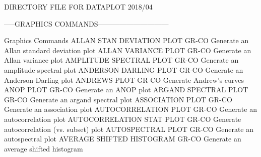                DIRECTORY FILE FOR DATAPLOT 2018/04

-----GRAPHICS COMMANDS------------------------------

Graphics Commands
ALLAN STAN DEVIATION PLOT   GR-CO Generate an Allan standard deviation plot
ALLAN VARIANCE PLOT         GR-CO Generate an Allan variance plot
AMPLITUDE SPECTRAL PLOT     GR-CO Generate an amplitude spectral plot
ANDERSON DARLING PLOT       GR-CO Generate an Anderson-Darling plot
ANDREWS PLOT                GR-CO Generate Andrew's curves
ANOP PLOT                   GR-CO Generate an ANOP plot
ARGAND SPECTRAL PLOT        GR-CO Generate an argand spectral plot
ASSOCIATION PLOT            GR-CO Generate an association plot
AUTOCORRELATION PLOT        GR-CO Generate an autocorrelation plot
AUTOCORRELATION STAT PLOT   GR-CO Generate autocorrelation (vs. subset) plot
AUTOSPECTRAL PLOT           GR-CO Generate an autospectral plot
AVERAGE SHIFTED HISTOGRAM   GR-CO Generate an average shifted histogram

